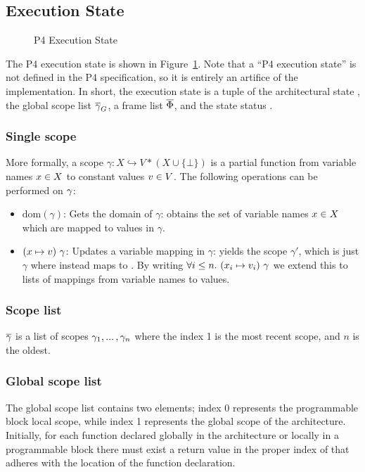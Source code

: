 \documentclass[UTF8]{article}
\begin{document}
\subsection{Execution State}

\begin{figure}[h!]
\centering\ottgrammartabular{
\ottstatus\ottinterrule
\ottstate\ottafterlastrule
}
\caption{P4 Execution State}  %
\label{fig:status}
\end{figure}

The P4 execution state is shown in Figure~\ref{fig:status}. Note that a ``P4 execution state'' is not defined in the P4 specification, so it is entirely an artifice of the \pfott{} implementation. In short, the execution state \exstate{} is a tuple of the architectural state \astate{}, the global scope list $\overline{\gamma}_G$, a frame list $\overline{\Phi}$, and the state status \status{}. 

\subsubsection*{Single scope}
More formally, a scope $\gamma : X \hookrightarrow V * (X \cup \{ \bot \} )$ is a partial function from variable names $x{} \in X$ to constant values $v{} \in V$. The following operations can be performed on $\gamma$:
\begin{itemize}
\item $\mathrm{dom} ( \gamma )$: Gets the domain of $\gamma$: obtains the set of variable names $x{} \in X$ which are mapped to values in $\gamma$.
\item $(x \mapsto  v) \,\, \gamma$: Updates a variable mapping in $\gamma$: yields the scope $\gamma'$, which is just $\gamma$ where \vn{} instead maps to \cval{}. By writing $\forall i \leq n. \,\, ({x}_i \mapsto  {\ensuremath{v}}_i) \,\, \gamma$ we extend this to lists of mappings from variable names to values.
\end{itemize}

\subsubsection*{Scope list}
$\overline{\gamma}$ is a list of scopes $\gamma_1 , ... \, , \gamma_n$ where the index 1 is the most recent scope, and $n$ is the oldest.

\subsubsection*{Global scope list}
The global scope list \gscopel{} contains two elements; index 0 represents the programmable block local scope, while index 1 represents the global scope of the architecture. Initially, for each function declared globally in the architecture or locally in a programmable block there must exist a return value in the proper index of \gscopel that adheres with the location of the function declaration.
\end{document}
